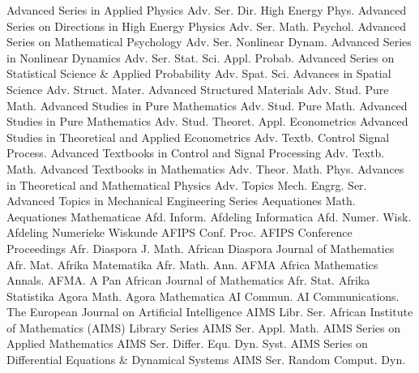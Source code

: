 {Advanced Series in Applied Physics}
{Adv. Ser. Dir. High Energy Phys.}
{Advanced Series on Directions in High Energy Physics}
{Adv. Ser. Math. Psychol.}
{Advanced Series on Mathematical Psychology}
{Adv. Ser. Nonlinear Dynam.}
{Advanced Series in Nonlinear Dynamics}
{Adv. Ser. Stat. Sci. Appl. Probab.}
{Advanced Series on Statistical Science & Applied Probability}
{Adv. Spat. Sci.}
{Advances in Spatial Science}
{Adv. Struct. Mater.}
{Advanced Structured Materials}
{Adv. Stud. Pure Math.}
{Advanced Studies in Pure Mathematics}
{Adv. Stud. Pure Math.}
{Advanced Studies in Pure Mathematics}
{Adv. Stud. Theoret. Appl. Econometrics}
{Advanced Studies in Theoretical and Applied Econometrics}
{Adv. Textb. Control Signal Process.}
{Advanced Textbooks in Control and Signal Processing}
{Adv. Textb. Math.}
{Advanced Textbooks in Mathematics}
{Adv. Theor. Math. Phys.}
{Advances in Theoretical and Mathematical Physics}
{Adv. Topics Mech. Engrg. Ser.}
{Advanced Topics in Mechanical Engineering Series}
{Aequationes Math.}
{Aequationes Mathematicae}
{Afd. Inform.}
{Afdeling Informatica}
{Afd. Numer. Wisk.}
{Afdeling Numerieke Wiskunde}
{AFIPS Conf. Proc.}
{AFIPS Conference Proceedings}
{Afr. Diaspora J. Math.}
{African Diaspora Journal of Mathematics}
{Afr. Mat.}
{Afrika Matematika}
{Afr. Math. Ann. AFMA}
{Africa Mathematics Annals. AFMA. A Pan African Journal of Mathematics}
{Afr. Stat.}
{Afrika Statistika}
{Agora Math.}
{Agora Mathematica}
{AI Commun.}
{AI Communications. The European Journal on Artificial Intelligence}
{AIMS Libr. Ser.}
{African Institute of Mathematics (AIMS) Library Series}
{AIMS Ser. Appl. Math.}
{AIMS Series on Applied Mathematics}
{AIMS Ser. Differ. Equ. Dyn. Syst.}
{AIMS Series on Differential Equations & Dynamical Systems}
{AIMS Ser. Random Comput. Dyn.}

